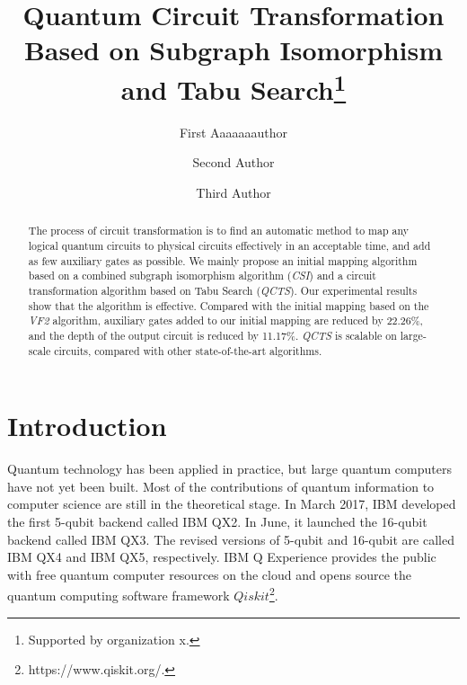 \documentclass[runningheads]{llncs}
\begin{document}
%
\title{Quantum Circuit Transformation Based on Subgraph Isomorphism and Tabu Search\thanks{Supported by organization x.}}
%
%
\author{First Aaaaaaauthor \and
Second Author \and
Third Author}
%
%
%
\maketitle              %
%
\begin{abstract}
	The process of circuit transformation is to find an automatic method to map any logical quantum circuits to physical circuits effectively in an acceptable time, and add as few auxiliary gates as possible. We mainly propose an initial mapping algorithm based on a combined subgraph isomorphism algorithm (\textit{CSI}) and a circuit transformation algorithm based on Tabu Search (\textit{QCTS}). Our experimental results show that the algorithm is effective. Compared with the initial mapping based on the \textit{VF2} algorithm, auxiliary gates added to our initial mapping are reduced by 22.26\%, and the depth of the output circuit is reduced by 11.17\%. \textit{QCTS} is scalable on large-scale circuits, compared with other state-of-the-art algorithms.
\end{abstract}

\section{Introduction}
\label{Introduction}
Quantum technology has been applied in practice, but large quantum computers have not yet been built. Most of the contributions of quantum information to computer science are still in the theoretical stage. In March 2017, IBM developed the first 5-qubit backend called IBM QX2.  In June, it launched the 16-qubit backend called IBM QX3. The revised versions of 5-qubit and 16-qubit are called IBM QX4 and IBM QX5, respectively. IBM Q Experience provides the public with free quantum computer resources on the cloud and opens source the quantum computing software framework $Qiskit$\footnote{https://www.qiskit.org/.}. 
\end{document}
